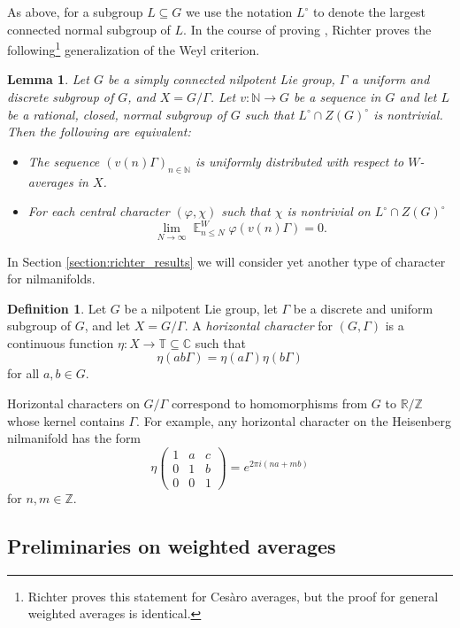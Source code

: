 \documentclass[12pt]{article}
\theoremstyle{plain} %
\newtheorem{lemma}[theorem]{Lemma}
\theoremstyle{definition} %
\newtheorem{definition}[theorem]{Definition}
\theoremstyle{plain}
\theoremstyle{plain}
\numberwithin{equation}{section}
\newcommand{\Cesaro}{Ces\`{a}ro }
\newcommand{\N}{\mathbb{N}}
\newcommand{\Z}{\mathbb{Z}}
\newcommand{\R}{\mathbb{R}}
\newcommand{\C}{\mathbb{C}}
\newcommand{\T}{\mathbb{T}}
\renewcommand{\leq}{\leqslant}
\renewcommand{\subset}{\subseteq}
\newcommand{\1}{\mathbbm{1}}
\newcommand{\E}{\operatorname{\mathbb{E}}}
\newcommand{\oo}{\infty}
\begin{document}
As above, for a subgroup $L\subset G$ we use the notation $L^{\circ}$ to denote the largest connected normal subgroup of $L$. 
In the course of proving \cite[Theorem 4.2]{Richter23}, Richter proves the following\footnote{Richter proves this statement for \Cesaro averages, but the proof for general weighted averages is identical.} generalization of the Weyl criterion.
\begin{lemma}\label{lem:richter_equivalence}
Let $G$ be a simply connected nilpotent
Lie group, $\Gamma$ a uniform and discrete subgroup of $G$, and $X=G/\Gamma$. 
Let $v:\N\rightarrow G$ be a sequence in $G$ and let $L$ be a rational, closed, normal subgroup of $G$ such that $L^{\circ}\cap Z(G)^{\circ}$ is nontrivial.
Then the following are equivalent:
    \begin{itemize}
   \item The sequence $(v(n)\Gamma)_{n\in \N}$ is uniformly distributed with respect to $W$-averages in $X$.
   \item For each central character $(\varphi,\chi)$ such that $\chi$ is nontrivial on $L^{\circ}\cap Z(G)^{\circ}$
   \begin{equation}\label{eq:richter_equivalence}
        \lim_{N\to\oo}\E_{n\leq N}^W\varphi(v(n)\Gamma)=0.
    \end{equation}
    \end{itemize}
\end{lemma}

In Section \ref{section:richter_results} we will consider yet another type of character for nilmanifolds.
\begin{definition}
    Let $G$ be a nilpotent Lie group, let $\Gamma$ be a discrete and uniform subgroup of $G$, and let $X=G/\Gamma$. A \emph{horizontal character} for $(G,\Gamma)$ is a continuous function $\eta:X\rightarrow \T\subset \C$ such that 
    $$
    \eta(ab\Gamma) = \eta(a\Gamma)\eta(b\Gamma)
    $$
    for all $a,b\in G$.
\end{definition}
Horizontal characters on $G/\Gamma$ correspond to homomorphisms from $G$ to $\R/\Z$ whose kernel contains $\Gamma$. For example, any horizontal character on the Heisenberg nilmanifold has the form $$
\eta \begin{pmatrix}
            1 & a & c\\
            0 & 1 & b\\
            0 & 0 & 1
            \end{pmatrix} = e^{2\pi i (na+mb)}
$$
for $n,m\in \Z$.
\subsection{Preliminaries on weighted averages}
\end{document}
